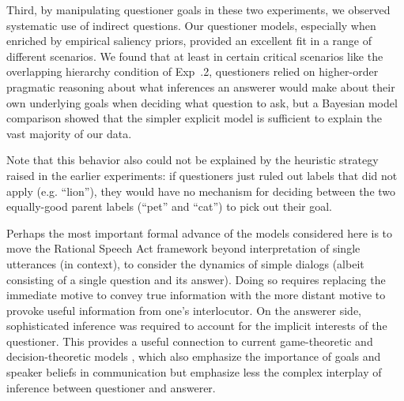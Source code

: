 \documentclass[12pt, floatsintext, jou]{apa6}
\begin{document}
Third, by manipulating questioner goals in these two experiments, we observed systematic use of indirect questions. Our questioner models, especially when enriched by empirical saliency priors, provided an excellent fit in a range of different scenarios. We found that at least in certain critical scenarios like the overlapping hierarchy condition of Exp~.2, questioners relied on higher-order pragmatic reasoning about what inferences an answerer would make about their own underlying goals when deciding what question to ask, but a Bayesian model comparison showed that the simpler explicit model is sufficient to explain the vast majority of our data.


 Note that this behavior also could not be explained by the heuristic strategy raised in the earlier experiments: if questioners just ruled out labels that did not apply (e.g. ``lion''), they would have no mechanism for deciding between the two equally-good parent labels (``pet'' and ``cat'') to pick out their goal. 

Perhaps the most important formal advance of the models considered here is to move the Rational Speech Act framework beyond interpretation of single utterances (in context), to consider the dynamics of simple dialogs (albeit consisting of a single question and its answer). 
Doing so requires replacing the immediate motive to convey true information with the more distant motive to provoke useful information from one's interlocutor. On the answerer side, sophisticated inference was required to account for the implicit interests of the questioner. This provides a useful connection to current game-theoretic and decision-theoretic models \cite{VogelBodoiaPottsJurafsky13_GricePOMDP, VanRooy03_QuestioningDecisionProblems}, which also emphasize the importance of goals and speaker beliefs in communication but emphasize less the complex interplay of inference between questioner and answerer.
\end{document}
